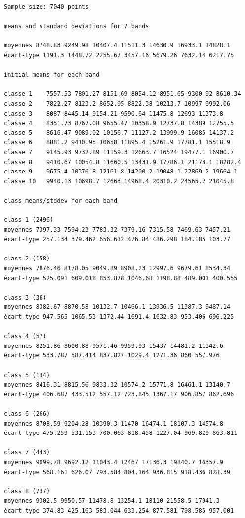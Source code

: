 \documentclass[earth,article,submit,pdftex,moreauthors]{Definitions/mdpi}
\begin{document}
{\begin{scriptsize}
\begin{verbatim}
Sample size: 7040 points

means and standard deviations for 7 bands

moyennes 8748.83 9249.98 10407.4 11511.3 14630.9 16933.1 14828.1
écart-type 1191.3 1448.72 2255.67 3457.16 5679.26 7632.14 6217.75

initial means for each band

classe 1    7557.53 7801.27 8151.69 8054.12 8951.65 9300.92 8610.34
classe 2    7822.27 8123.2 8652.95 8822.38 10213.7 10997 9992.06
classe 3    8087 8445.14 9154.21 9590.64 11475.8 12693 11373.8
classe 4    8351.73 8767.08 9655.47 10358.9 12737.8 14389 12755.5
classe 5    8616.47 9089.02 10156.7 11127.2 13999.9 16085 14137.2
classe 6    8881.2 9410.95 10658 11895.4 15261.9 17781.1 15518.9
classe 7    9145.93 9732.89 11159.3 12663.7 16524 19477.1 16900.7
classe 8    9410.67 10054.8 11660.5 13431.9 17786.1 21173.1 18282.4
classe 9    9675.4 10376.8 12161.8 14200.2 19048.1 22869.2 19664.1
classe 10   9940.13 10698.7 12663 14968.4 20310.2 24565.2 21045.8

class means/stddev for each band

class 1 (2496)
moyennes 7397.33 7594.23 7783.32 7379.16 7315.58 7469.63 7457.21
écart-type 257.134 379.462 656.612 476.84 486.298 184.185 103.77

class 2 (158)
moyennes 7876.46 8178.05 9049.89 8908.23 12997.6 9679.61 8534.34
écart-type 525.091 609.018 853.878 1046.68 1198.88 489.001 400.555

class 3 (36)
moyennes 8382.67 8870.58 10132.7 10466.1 13936.5 11387.3 9487.14
écart-type 947.565 1065.53 1372.44 1691.4 1632.83 953.406 696.225

class 4 (57)
moyennes 8251.86 8600.88 9571.46 9959.93 15437 14481.2 11342.6
écart-type 533.787 587.414 837.827 1029.4 1271.36 860 557.976

class 5 (134)
moyennes 8416.31 8815.56 9833.32 10574.2 15771.8 16461.1 13140.7
écart-type 406.687 433.512 557.12 723.845 1367.17 906.857 862.696

class 6 (266)
moyennes 8708.59 9204.28 10390.3 11470 16474.1 18107.3 14574.8
écart-type 475.259 531.153 700.063 818.458 1227.04 969.829 863.811

class 7 (443)
moyennes 9099.78 9692.12 11043.4 12467 17136.3 19840.7 16357.9
écart-type 568.161 626.07 793.584 804.164 936.815 918.436 828.39

class 8 (737)
moyennes 9302.5 9950.57 11478.8 13254.1 18110 21558.5 17941.3
écart-type 374.83 425.163 583.044 633.254 877.581 798.585 957.001


\end{verbatim}
\end{scriptsize}}
\end{document}

